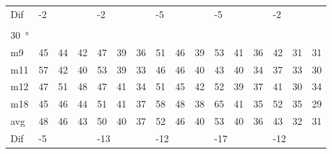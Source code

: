 \begin{table}[H]
\begin{tabular}{l|l|l|l|l|l|l|l|l|l|l|l|l|lll}
Dif & \multicolumn{3}{l|}{-2} & \multicolumn{3}{l|}{-2} & \multicolumn{3}{l|}{-5} & \multicolumn{3}{l|}{-5} & \multicolumn{3}{l}{-2}  \\ 
 \multicolumn{16}{l}{ } \\                         
\SI{30}{\degree}   & \multicolumn{3}{l|}{} & \multicolumn{3}{l|}{} & \multicolumn{3}{l|}{} & \multicolumn{3}{l|}{} & \multicolumn{3}{l}{}   \\  \hline
m9    &  45    &  44    &  42    &  47    &  39    &   36   &  51    &   46    &  39    &   53    &   41   &   36   & \multicolumn{1}{l|}{42} & \multicolumn{1}{l|}{31} & 31 \\
m11  &  57    &  42    &  40    &   53   &   39   &   33   &  46    &   46    &  40    &    43   &   40   &  34   & \multicolumn{1}{l|}{37} & \multicolumn{1}{l|}{33} & 30 \\
m12  &  47    &   51   &  48    &  47    &   41   &   34   &   51   &  45     &   42   &    52   &   39   &   37   & \multicolumn{1}{l|}{41} & \multicolumn{1}{l|}{30} & 34 \\
m18  &  45    &   46   &  44    &   51   &  41    &   37   &   58   &   48    &  38    &    65   &  41    &   35   & \multicolumn{1}{l|}{52} & \multicolumn{1}{l|}{35} & 29 \\ \hline
avg &  48    &  46    &  43    &  50    & 40     &  37    &   52   &  46     &  40    &  53     &   40   &  36    & \multicolumn{1}{l|}{43} & \multicolumn{1}{l|}{32}  & 31 \\ \hline  
Dif & \multicolumn{3}{l|}{-5} & \multicolumn{3}{l|}{-13} & \multicolumn{3}{l|}{-12} & \multicolumn{3}{l|}{-17} & \multicolumn{3}{l}{-12}                                
\end{tabular}
\end{table}


